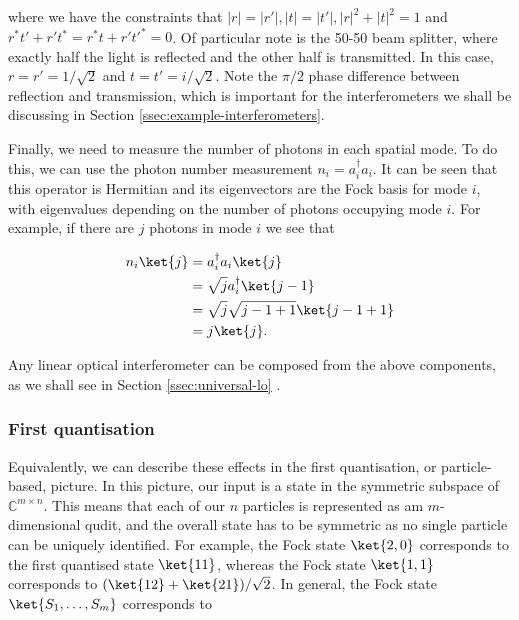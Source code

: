 \noindent where we have the constraints that $|r|=|r'|, |t|=|t'|, |r|^2+|t|^2=1$ and $r^*t' + r't^* = r^*t+r't'^*=0$. Of particular note is the 50-50 beam splitter, where exactly half the light is reflected and the other half is transmitted. In this case, $r=r'=1/\sqrt{2}$ and $t=t'=i/\sqrt{2}$. Note the $\pi/2$ phase difference between reflection and transmission, which is important for the interferometers we shall be discussing in Section \ref{ssec:example-interferometers}.

Finally, we need to measure the number of photons in each spatial mode. To do this, we can use the photon number measurement $n_i = a_i^\dagger a_i$. It can be seen that this operator is Hermitian and its eigenvectors are the Fock basis for mode $i$, with eigenvalues depending on the number of photons occupying mode $i$. For example, if there are $j$ photons in mode $i$ we see that

\begin{align}
n_i\ket{j} &= a_i^\dagger a_i\ket{j}\\
&= \sqrt{j}a_i^\dagger\ket{j-1}\\
&= \sqrt{j}\sqrt{j-1+1}\ket{j-1+1}\\
&= j\ket{j}.
\end{align}


Any linear optical interferometer can be composed from the above components, as we shall see in Section \ref{ssec:universal-lo} \cite{hurwitz1897, reck1994, clements2016}.

\subsubsection{First quantisation}

Equivalently, we can describe these effects in the first quantisation, or particle-based, picture. In this picture, our input is a state in the symmetric subspace of $\mathbb{C}^{m\times n}$. This means that each of our $n$ particles is represented as am $m$-dimensional qudit, and the overall state has to be symmetric as no single particle can be uniquely identified. For example, the Fock state $\ket{2,0}$ corresponds to the first quantised state $\ket{11}$, whereas the Fock state $\ket{1,1}$ corresponds to $(\ket{12} + \ket{21})/\sqrt{2}$. In general, the Fock state $\ket{S_1,\dots,S_m}$ corresponds to

